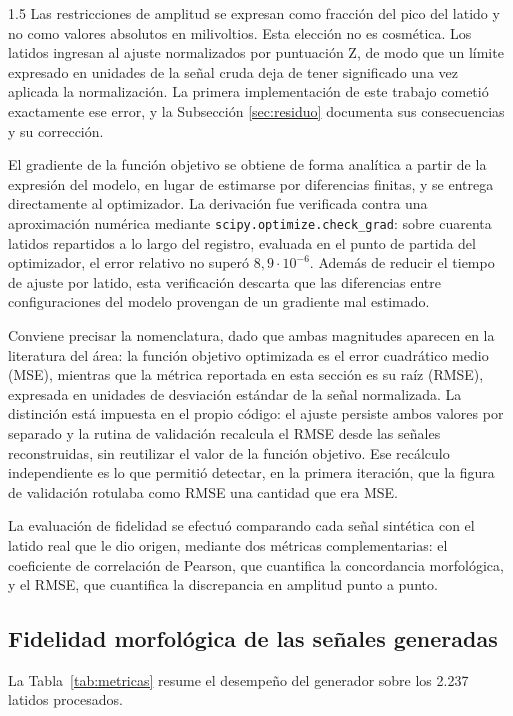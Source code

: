 \begin{spacing}{1.5}
Las restricciones de amplitud se expresan como fracción del pico del latido y no como valores absolutos en milivoltios. Esta elección no es cosmética. Los latidos ingresan al ajuste normalizados por puntuación Z, de modo que un límite expresado en unidades de la señal cruda deja de tener significado una vez aplicada la normalización. La primera implementación de este trabajo cometió exactamente ese error, y la Subsección \ref{sec:residuo} documenta sus consecuencias y su corrección.

El gradiente de la función objetivo se obtiene de forma analítica a partir de la expresión del modelo, en lugar de estimarse por diferencias finitas, y se entrega directamente al optimizador. La derivación fue verificada contra una aproximación numérica mediante \texttt{scipy.optimize.check\_grad}: sobre cuarenta latidos repartidos a lo largo del registro, evaluada en el punto de partida del optimizador, el error relativo no superó $8{,}9\cdot10^{-6}$. Además de reducir el tiempo de ajuste por latido, esta verificación descarta que las diferencias entre configuraciones del modelo provengan de un gradiente mal estimado.

Conviene precisar la nomenclatura, dado que ambas magnitudes aparecen en la literatura del área: la función objetivo optimizada es el error cuadrático medio (MSE), mientras que la métrica reportada en esta sección es su raíz (RMSE), expresada en unidades de desviación estándar de la señal normalizada. La distinción está impuesta en el propio código: el ajuste persiste ambos valores por separado y la rutina de validación recalcula el RMSE desde las señales reconstruidas, sin reutilizar el valor de la función objetivo. Ese recálculo independiente es lo que permitió detectar, en la primera iteración, que la figura de validación rotulaba como RMSE una cantidad que era MSE.

La evaluación de fidelidad se efectuó comparando cada señal sintética con el latido real que le dio origen, mediante dos métricas complementarias: el coeficiente de correlación de Pearson, que cuantifica la concordancia morfológica, y el RMSE, que cuantifica la discrepancia en amplitud punto a punto.

\subsection{Fidelidad morfológica de las señales generadas}

La Tabla~\ref{tab:metricas} resume el desempeño del generador sobre los 2.237 latidos procesados.


\end{spacing}
